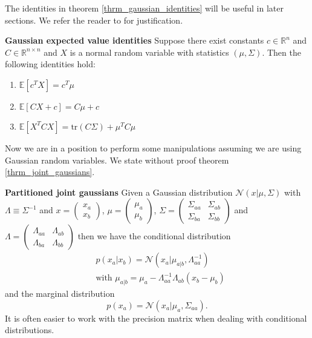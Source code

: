 The identities in theorem \ref{thrm_gaussian_identities} will be useful in later sections. We refer the reader to \cite{davidian} for justification.
\begin{thrm}
\textbf{Gaussian expected value identities}
Suppose there exist constants $c \in \mathbb{R}^n$ and $C \in \mathbb{R}^{n \times n}$ and $X$ is a normal random variable with statistics $(\mu, \Sigma)$. Then the following identities hold:
\begin{enumerate}
\item
$\mathbb{E}[c^TX] = c^T\mu$
\item
$\mathbb{E}[CX+c] = C\mu + c$
\item
$\mathbb{E}[X^TCX] = \text{tr}(C\Sigma) + \mu^TC\mu$
\end{enumerate}
\label{thrm_gaussian_identities}
\end{thrm}  
Now we are in a position to perform some manipulations assuming we are using Gaussian random variables. We state without proof theorem \ref{thrm_joint_gaussians}.
\begin{thrm}
\textbf{Partitioned joint gaussians}
Given a Gaussian distribution $\mathcal{N}(x|\mu,\Sigma)$ with $\Lambda \equiv \Sigma^{-1}$ and $x=\begin{pmatrix}
x_a \\ x_b
\end{pmatrix}$, $\mu=\begin{pmatrix}
\mu_a \\ \mu_b
\end{pmatrix}$, $\Sigma=\begin{pmatrix}
\Sigma_{aa} & \Sigma_{ab} \\ \Sigma_{ba} & \Sigma_{bb}
\end{pmatrix}$ and $\Lambda = \begin{pmatrix}
\Lambda_{aa} & \Lambda_{ab} \\ \Lambda_{ba} & \Lambda_{bb}
\end{pmatrix}$ then we have the conditional distribution 
\begin{equation}
\begin{aligned}
&p(x_a|x_b) = \mathcal{N}(x_a|\mu_{a|b}, \Lambda_{aa}^{-1}) \\
&\text{with } \mu_{a|b} = \mu_a - \Lambda_{aa}^{-1}\Lambda_{ab}(x_b-\mu_b)
\end{aligned}
\label{eq_part_joint_gauss1}
\end{equation}
and the marginal distribution
\begin{equation}
p(x_a) = \mathcal{N}(x_a|\mu_a,\Sigma_{aa}).
\label{eq_part_joint_gauss2}
\end{equation}
\label{thrm_joint_gaussians}
It is often easier to work with the precision matrix when dealing with conditional distributions. 
\end{thrm}
